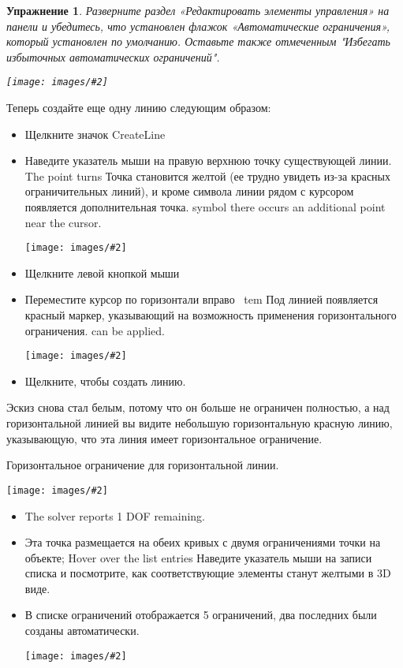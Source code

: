 \documentclass[12pt,titlepage]{article}
\newcommand{\icon}[1]{\raisebox{-1em}{\rule{0pt}{27pt}\texttt{[image: images/\#1]}}}
\newcommand{\img}[2]{\vspace{2ex}\noindent\texttt{[image: images/\#2]}}
\newtheorem{Exercise}{Упражнение}
\begin{document}
\begin{Exercise}
Разверните раздел «Редактировать элементы управления» на панели и убедитесь, что установлен флажок «Автоматические ограничения», который установлен по умолчанию. Оставьте также отмеченным "Избегать избыточных автоматических ограничений".

\img{width=0.56\textwidth}{AutoConstraintsOn}
\end{Exercise}

Теперь создайте еще одну линию следующим образом:
\begin{itemize}
\item Щелкните значок CreateLine \icon{Sketcher_CreateLine}
\item Наведите указатель мыши на правую верхнюю точку существующей линии. The point turns
      Точка становится желтой (ее трудно увидеть из-за красных ограничительных линий), и кроме символа линии рядом с курсором появляется дополнительная точка.
      symbol there occurs an additional point near the cursor.

\img{}{Auto1}
\item Щелкните левой кнопкой мыши
\item Переместите курсор по горизонтали вправо      
\ tem Под линией появляется красный маркер, указывающий на возможность применения горизонтального ограничения.
      can be applied.

\img{}{Auto2}
\item Щелкните, чтобы создать линию.
\end{itemize}

Эскиз снова стал белым, потому что он больше не ограничен полностью, а над горизонтальной линией вы видите небольшую горизонтальную красную линию, указывающую, что эта линия имеет горизонтальное ограничение.
\item [Горизонтальное ограничение] для горизонтальной линии.

\label{auto3}
\img{}{Auto3}

\begin{itemize}
\item The solver reports 1 DOF remaining.
\item Эта точка размещается на обеих кривых с двумя ограничениями точки на объекте; Hover over the list entries
      Наведите указатель мыши на записи списка и посмотрите, как соответствующие элементы станут желтыми в 3D виде.
\item В списке ограничений отображается 5 ограничений, два последних были созданы автоматически.

\img{}{ListConstraintsAuto}
\end{itemize}
\end{document}

